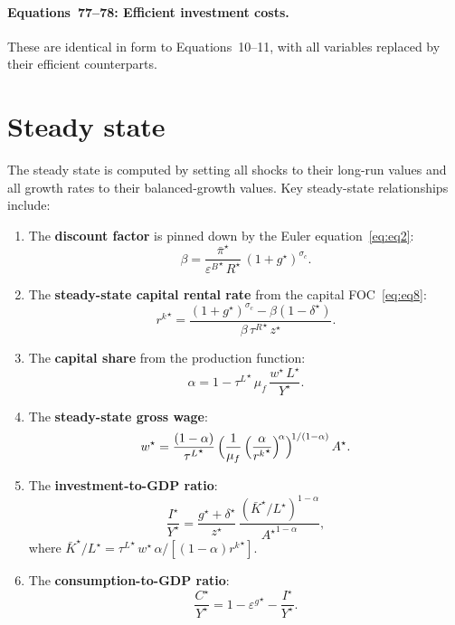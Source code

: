 \documentclass[11pt,a4paper]{article}
\newcommand{\bbar}[1]{\bar{#1}}
\begin{document}
\paragraph{Equations~77--78: Efficient investment costs.}
These are identical in form to Equations~10--11, with all variables
replaced by their efficient counterparts.


\section{Steady state}
\label{sec:steady_state}

The steady state is computed by setting all shocks to their long-run
values and all growth rates to their balanced-growth values. Key
steady-state relationships include:

\begin{enumerate}[nosep]
  \item The \textbf{discount factor} is pinned down by the Euler
    equation~\eqref{eq:eq2}:
    \[
      \beta = \frac{\bbar\pi^{\star}}{{\varepsilon^B}^{\star}\,R^{\star}}\,
      (1+g^{\star})^{\sigma_c}.
    \]
  \item The \textbf{steady-state capital rental rate} from the capital
    FOC~\eqref{eq:eq8}:
    \[
      {r^k}^{\star} = \frac{(1+g^{\star})^{\sigma_c} - \beta(1-\delta^{\star})}
      {\beta\,{\tau^R}^{\star}\,z^{\star}}.
    \]
  \item The \textbf{capital share} from the production function:
    \[
      \alpha = 1 - {\tau^L}^{\star}\,\mu_f\,\frac{w^{\star}\,L^{\star}}{Y^{\star}}.
    \]
  \item The \textbf{steady-state gross wage}:
    \[
      w^{\star} = \frac{(1-\alpha)}{{\tau^L}^{\star}}\,
      \Bigl(\frac{1}{\mu_f}\,
      \Bigl(\frac{\alpha}{{r^k}^{\star}}\Bigr)^{\!\alpha}\Bigr)^{\!1/(1-\alpha)}\,
      A^{\star}.
    \]
  \item The \textbf{investment-to-GDP ratio}:
    \[
      \frac{I^{\star}}{Y^{\star}}
      = \frac{g^{\star} + \delta^{\star}}{z^{\star}}\,
        \frac{(\bbar K^{\star}/L^{\star})^{1-\alpha}}{\left.A^{\star}\right.^{1-\alpha}},
    \]
    where $\bbar K^{\star}/L^{\star} = {\tau^L}^{\star}\,w^{\star}\,\alpha/[(1-\alpha){r^k}^{\star}]$.
  \item The \textbf{consumption-to-GDP ratio}:
    \[
      \frac{C^{\star}}{Y^{\star}}
      = 1 - {\varepsilon^g}^{\star} - \frac{I^{\star}}{Y^{\star}}.
    \]
\end{enumerate}
\end{document}
